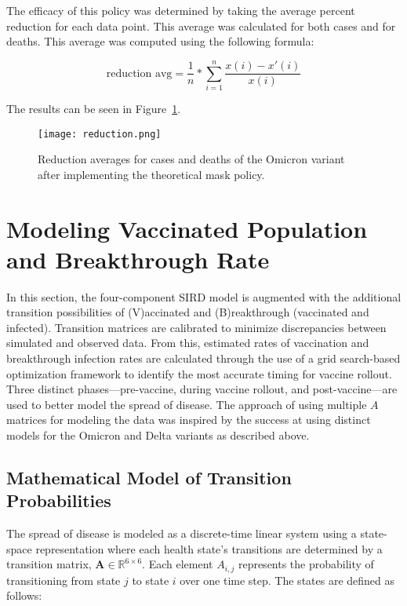 \documentclass[conference]{IEEEtran}
\begin{document}
The efficacy of this policy was determined by taking the average percent reduction for each data point. This average was calculated for both cases and for deaths. This average was computed using the following formula:

\begin{equation}
  \text{reduction avg} = \frac{1}{n} * \sum_{i = 1}^{n} \frac{x(i) - x'(i)}{x(i)}
\end{equation}

The results can be seen in Figure~\ref{fig:policy_results}.

\begin{figure}[htbp]
\centerline{\texttt{[image: reduction.png]}}
\caption{Reduction averages for cases and deaths of the Omicron variant after implementing the theoretical mask policy.}
\label{fig:policy_results}
\end{figure}

\section{Modeling Vaccinated Population and Breakthrough Rate}
In this section, the four-component SIRD model is augmented with the additional transition possibilities of (V)accinated and (B)reakthrough (vaccinated and infected). Transition matrices are calibrated to minimize discrepancies between simulated and observed data. From this, estimated rates of vaccination and breakthrough infection rates are calculated through the use of a grid search-based optimization framework to identify the most accurate timing for vaccine rollout. Three distinct phases—pre-vaccine, during vaccine rollout, and post-vaccine—are used to better model the spread of disease. The approach of using multiple $A$ matrices for modeling the data was inspired by the success at using distinct models for the Omicron and Delta variants as described above.

\subsection{Mathematical Model of Transition Probabilities}
The spread of disease is modeled as a discrete-time linear system using a state-space representation where each health state's transitions are determined by a transition matrix, $\mathbf{A} \in \mathbb{R}^{6 \times 6}$. Each element $A_{i,j}$ represents the probability of transitioning from state $j$ to state $i$ over one time step. The states are defined as follows:
\end{document}
